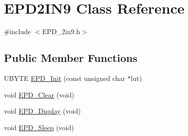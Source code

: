 \hypertarget{classEPD2IN9}{\section{E\-P\-D2\-I\-N9 Class Reference}
\label{classEPD2IN9}
}


{\ttfamily \#include $<$E\-P\-D\-\_\-2in9.\-h$>$}

\subsection*{Public Member Functions}
\begin{DoxyCompactItemize}
\item 
U\-B\-Y\-T\-E \hyperlink{classEPD2IN9_a8b04479e3b2ad2419340028e53d2fb4f}{E\-P\-D\-\_\-\-Init} (const unsigned char $\ast$lut)
\item 
void \hyperlink{classEPD2IN9_a21ab8783566570bb88840949dca2c689}{E\-P\-D\-\_\-\-Clear} (void)
\item 
void \hyperlink{classEPD2IN9_a31fcb5081947a9f0624501c512d2f288}{E\-P\-D\-\_\-\-Display} (void)
\item 
void \hyperlink{classEPD2IN9_a84ab45f90ce0573466661aeb6a95c484}{E\-P\-D\-\_\-\-Sleep} (void)
\end{DoxyCompactItemize}


